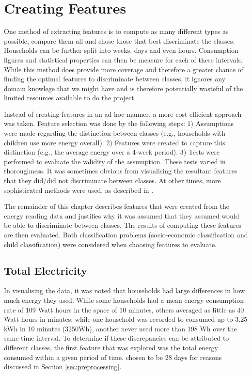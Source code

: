 \qqPlot


\section{Creating Features}
\label{sec:creatingFeatures}
One method of extracting features is to compute as many different types as possible, compare them all and chose those that best discriminate the classes. Households can be further split into weeks, days and even hours. Consumption figures and statistical properties can then be measure for each of these intervals. While this method does provide more coverage and therefore a greater chance of finding the optimal features to discriminate between classes, it ignores any domain knowlege that we might have and is therefore potentially wasteful of the limited resources available to do the project. 

Instead of creating features in an ad hoc manner, a more cost efficient approach was taken. Feature selection was done by the following steps: 1) Assumptions were made regarding the distinction between classes (e.g., households with children use more energy overall). 2) Features were created to capture this distinction (e.g., the average energy over a 4-week period). 3) Tests were performed to evaluate the validity of the assumption. These tests varied in thoroughness. It was sometimes obvious from visualising the resultant features that they did/did not discriminate between classes. At other times, more sophisticated methods were used, as described in \featureSelectionSection.
\newline

The remainder of this chapter describes features that were created from the energy reading data and justifies why it was assumed that they assumed would be able to discriminate between classes. The results of computing these features are then evaluated. Both classification problems (socio-economic classification and child classification) were considered when choosing features to evaluate.

\subsection*{Total Electricity}
In visualising the data, it was noted that households had large differences in how much energy they used. While some households had a mean energy consumption rate of 109 Watt hours in the space of 10 minutes, others averaged as little as 40 Watt hours in minutes; while one household was recorded to consumed up to 3.25 kWh in 10 minutes (3250Wh), another never used more than 198 Wh over the same time interval. To determine if these discrepancies can be attributed to different classes, the first feature that was explored was the total energy consumed within a given period of time, chosen to be 28 days for reasons discussed in Section \ref{sec:preprocessing}. 

